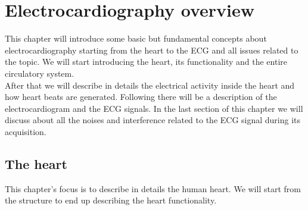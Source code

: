 
\chapter{Electrocardiography overview}
\label{Chapter2} 

This chapter will introduce some basic but fundamental concepts about electrocardiography starting from the heart to the ECG and all issues related to the topic. We will start introducing the heart, its functionality and the entire circulatory system.\\
After that we will describe in details the electrical activity inside the heart and how heart beats are generated. Following there will be a description of the electrocardiogram and the ECG signals. In the last section of this chapter we will discuss about all the noises and interference related to the ECG signal during its acquisition. 

\section{The heart}
This chapter’s focus is to describe in details the human heart. We will start from the structure to end up describing the heart functionality.

